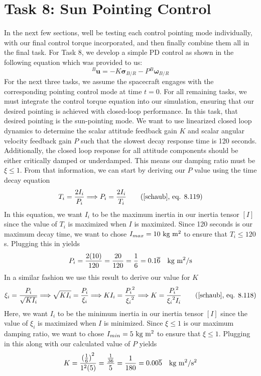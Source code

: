 \documentclass[conf]{new-aiaa}
\begin{document}
\section{Task 8: Sun Pointing Control}
In the next few sections, well be testing each control pointing mode individually, with our final control torque incorporated, and then finally combine them all in the final task. For Task 8, we develop a simple PD control as shown in the following equation which was provided to us:
\[
{}^B\bm{u} = -K\bm{\sigma}_{B/R} - P{}^B\bm{\omega}_{B/R}
\]
For the next three tasks, we assume the spacecraft engages with the corresponding pointing control mode at time $t=0$. For all remaining tasks, we must integrate the control torque equation into our simulation, ensuring that our desired pointing is achieved with closed-loop performance. In this task, that desired pointing is the sun-pointing mode. We want to use linearized closed loop dynamics to determine the scalar attitude feedback gain $K$ and scalar angular velocity feedback gain $P$ such that the slowest decay response time is 120 seconds. Additionally, the closed loop response for all attitude components should be either critically damped or underdamped. This means our damping ratio must be $\xi\leq1$. From that information, we can start by deriving our $P$ value using the time decay equation
\[
T_i=\frac{2I_i}{P_i} \Longrightarrow P_i=\frac{2I_i}{T_i} \tag{\cite{schaub},~eq. 8.119}
\]
In this equation, we want $I_i$ to be the maximum inertia in our inertia tensor $[I]$ since the value of $T_i$ is maximized when $I$ is maximized. Since 120 seconds is our maximum decay time, we want to chose $I_{max}=10 \text{ kg m\textsuperscript{2}}$ to ensure that $T_i\leq120$s. Plugging this in yields
\[
P_i = \frac{2(10)}{120} = \frac{20}{120} = \frac{1}{6} = 0.1\overline{6}\quad \text{kg m\textsuperscript{2}/s}
\]
In a similar fashion we use this result to derive our value for $K$
\[
\xi_i=\frac{P_i}{\sqrt{KI_i}} \Longrightarrow \sqrt{KI_i}=\frac{P_i}{\xi_i} \Longrightarrow KI_i=\frac{{P_i}^2}{{\xi_i}^2} \Longrightarrow K=\frac{{P_i}^2}{{\xi_i}^2I_i} \tag{\cite{schaub},~eq. 8.118}
\]
Here, we want $I_i$ to be the minimum inertia in our inertia tensor $[I]$ since the value of $\xi_i$ is maximized when $I$ is minimized. Since $\xi\leq1$ is our maximum damping ratio, we want to chose $I_{min}=5 \text{ kg m\textsuperscript{2}}$ to ensure that $\xi\leq1$. Plugging in this along with our calculated value of $P$ yields
\[
K = \frac{{(\frac{1}{6})}^2}{1^2(5)} = \frac{\frac{1}{36}}{5} = \frac{1}{180} = 0.00\overline{5} \quad \text{kg m\textsuperscript{2}/s\textsuperscript{2}}
\]
\end{document}
